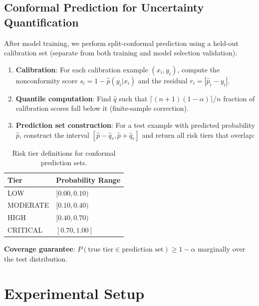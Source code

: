 \documentclass{article}
\begin{document}
\subsection{Conformal Prediction for Uncertainty Quantification}
\label{sec:conformal}

After model training, we perform split-conformal prediction using a held-out calibration set (separate from both training and model selection validation):

\begin{enumerate}
\item \textbf{Calibration}: For each calibration example $(x_i, y_i)$, compute the nonconformity score $s_i = 1 - \hat{p}(y_i | x_i)$ and the residual $r_i = |\hat{p}_i - y_i|$.

\item \textbf{Quantile computation}: Find $\hat{q}$ such that $\lceil(n+1)(1-\alpha)\rceil / n$ fraction of calibration scores fall below it (finite-sample correction).

\item \textbf{Prediction set construction}: For a test example with predicted probability $\hat{p}$, construct the interval $[\hat{p} - \hat{q}_r, \hat{p} + \hat{q}_r]$ and return all risk tiers that overlap:
\end{enumerate}

\begin{table}[h]
\centering
\caption{Risk tier definitions for conformal prediction sets.}
\label{tab:risk-tiers}
\begin{tabular}{@{}ll@{}}
\toprule
Tier & Probability Range \\
\midrule
LOW & $[0.00, 0.10)$ \\
MODERATE & $[0.10, 0.40)$ \\
HIGH & $[0.40, 0.70)$ \\
CRITICAL & $[0.70, 1.00]$ \\
\bottomrule
\end{tabular}
\end{table}

\textbf{Coverage guarantee}: $P(\text{true tier} \in \text{prediction set}) \geq 1 - \alpha$ marginally over the test distribution.

\section{Experimental Setup}
\label{sec:setup}
\end{document}
